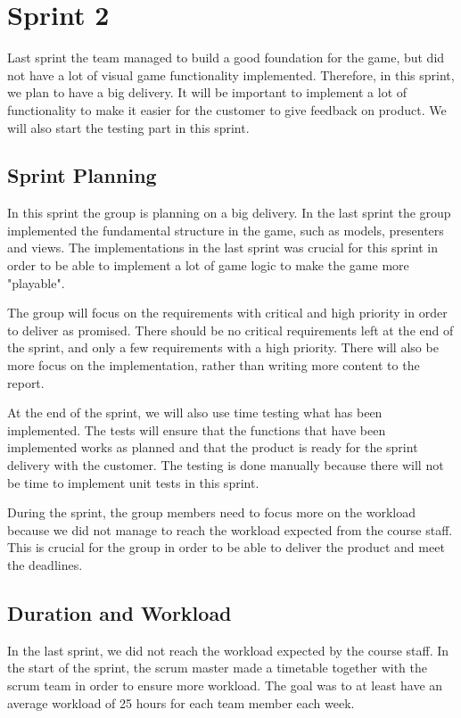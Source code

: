 
\section{Sprint 2}

	Last sprint the team managed to build a good foundation for the game, but did not 
	have a lot of visual game functionality implemented. Therefore, in this sprint, we 
	plan to have a big delivery. It will be important to implement a lot of functionality 
	to make it easier for the customer to give feedback on product. We will also start 
	the testing part in this sprint.

\subsection{Sprint Planning}
	In this sprint the group is planning on a big delivery. In the last sprint the group
	implemented the fundamental structure in the game, such as models, presenters and views. 
	The implementations in the last sprint was crucial for this sprint in order to 
	be able to implement a lot of game logic to make the game more "playable".

	The group will focus on the requirements with critical and high priority in order
	to deliver as promised. There should be no critical requirements left at the end of 
	the sprint, and only a few requirements with a high priority. There will also be more 
	focus on the implementation, rather than writing more content to the report.

	At the end of the sprint, we will also use time testing what has been implemented.
	The tests will ensure that the functions that have been implemented works as planned 
	and that the product is ready for the sprint delivery with the customer. The testing is 
	done manually because there will not be time to implement unit tests in this sprint.

	During the sprint, the group members need to focus more on the workload because we did
	not manage to reach the workload expected from the course staff. This is crucial
	for the group in order to be able to deliver the product and meet the deadlines.

	\clearpage

\subsection{Duration and Workload}
	In the last sprint, we did not reach the workload expected by the course staff.
	In the start of the sprint, the scrum master made a timetable together with the
	scrum team in order to ensure more workload. The goal was to at least have an
	average workload of 25 hours for each team member each week. 

